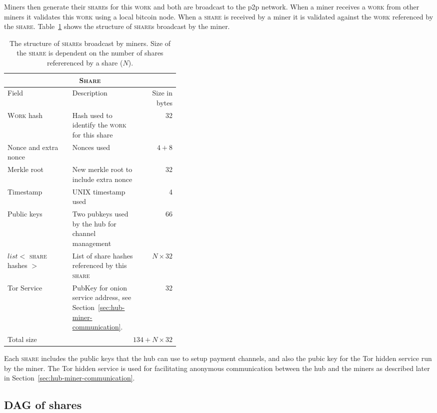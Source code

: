 \documentclass{article}
\begin{document}
Miners then generate their \textsc{share}s for this \textsc{work} and
both are broadcast to the p2p network. When a miner receives a
\textsc{work} from other miners it validates this \textsc{work} using
a local bitcoin node. When a \textsc{share} is received by a miner it
is validated against the \textsc{work} referenced by the
\textsc{share}. Table~\ref{table:share} shows the structure of
\textsc{share}s broadcast by the miner.


\begin{table}
  \centering
  \begin{tabular}{ lp{0.4\linewidth}r }
    \multicolumn{3}{c}{\textsc{Share}} \\
    \hline
    Field & Description & Size in bytes \\
    \hline
    \textsc{Work} hash & Hash used to identify the \textsc{work} for this share & 32 \\
    Nonce and extra nonce & Nonces used & $4+8$ \\
    Merkle root & New merkle root to include extra nonce & 32 \\
    Timestamp & UNIX timestamp used & 4 \\
    Public keys & Two pubkeys used by the hub for channel management & 66 \\
    $list<$ \textsc{share} hashes $>$ & List of share hashes referenced by this \textsc{share} & $N \times 32$ \\
    Tor Service & PubKey for onion service address, see Section~\ref{sec:hub-miner-communication}. & 32 \\
    \hline
    Total size & \multicolumn{2}{r}{$134 + N \times 32$} \\
    \hline
  \end{tabular}
  \caption{The structure of \textsc{share}s broadcast by miners. Size
    of the \textsc{share} is dependent on the number of shares
    refererenced by a share ($N$).}\label{table:share}
\end{table}

Each \textsc{share} includes the public keys that the hub can use to
setup payment channels, and also the pubic key for the Tor hidden
service run by the miner. The Tor hidden service is used for
facilitating anonymous communication between the hub and the miners as
described later in Section~\ref{sec:hub-miner-communication}.

\subsection{DAG of shares}
\end{document}
